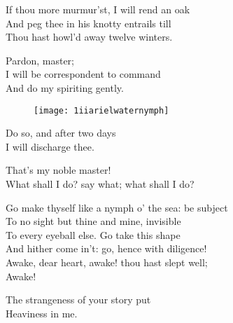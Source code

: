 \begin{verse_speech}[Prospero] 
If thou more murmur'st, I will rend an oak\\
And peg thee in his knotty entrails till\\
Thou hast howl'd away twelve winters.
\end{verse_speech}

\begin{verse_speech}[Ariel] 
Pardon, master;\\
I will be correspondent to command\\
And do my spiriting gently.
\end{verse_speech}

\begin{figure}[tbh]
\centering
\texttt{[image: 1iiarielwaternymph]}
\end{figure}

\begin{verse_speech}[Prospero] 
Do so, and after two days\\
I will discharge thee.
\end{verse_speech}

\begin{verse_speech}[Ariel] 
That's my noble master!\\
What shall I do? say what; what shall I do?
\end{verse_speech}

\begin{verse_speech}[Prospero] 
Go make thyself like a nymph o' the sea: be subject\\
To no sight but thine and mine, invisible\\
To every eyeball else. Go take this shape\\
And hither come in't: go, hence with diligence!\\
Awake, dear heart, awake! thou hast slept well; \\
Awake!
\end{verse_speech}

\begin{verse_speech}[Miranda] 
The strangeness of your story put\\
Heaviness in me.
\end{verse_speech}

